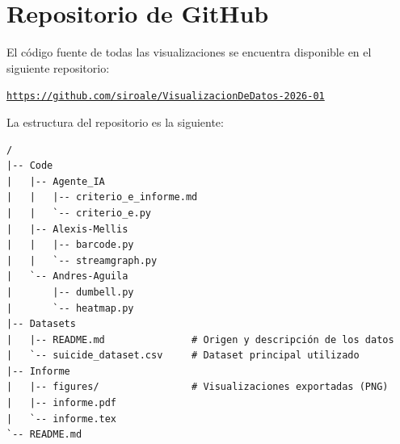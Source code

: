 \documentclass[12pt, letterpaper]{article}
\begin{document}
\section{Repositorio de GitHub}

El código fuente de todas las visualizaciones se encuentra disponible en el siguiente repositorio:

\begin{center}
  \href{https://github.com/siroale/VisualizacionDeDatos-2026-01}{\texttt{https://github.com/siroale/VisualizacionDeDatos-2026-01}}
\end{center}

La estructura del repositorio es la siguiente:
\begin{verbatim}
/
|-- Code
|   |-- Agente_IA
|   |   |-- criterio_e_informe.md
|   |   `-- criterio_e.py
|   |-- Alexis-Mellis
|   |   |-- barcode.py
|   |   `-- streamgraph.py
|   `-- Andres-Aguila
|       |-- dumbell.py
|       `-- heatmap.py
|-- Datasets
|   |-- README.md               # Origen y descripción de los datos
|   `-- suicide_dataset.csv     # Dataset principal utilizado
|-- Informe
|   |-- figures/                # Visualizaciones exportadas (PNG)
|   |-- informe.pdf
|   `-- informe.tex
`-- README.md
\end{verbatim}

\end{document}
